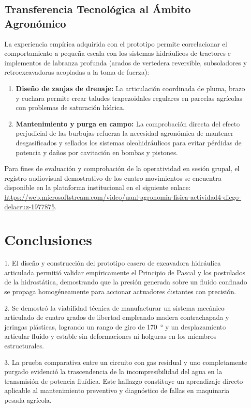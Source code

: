 \subsection{Transferencia Tecnológica al Ámbito Agronómico}
La experiencia empírica adquirida con el prototipo permite correlacionar el comportamiento a pequeña escala con los sistemas hidráulicos de tractores e implementos de labranza profunda (arados de vertedera reversible, subsoladores y retroexcavadoras acopladas a la toma de fuerza):
\begin{enumerate}
    \item \textbf{Diseño de zanjas de drenaje:} La articulación coordinada de pluma, brazo y cuchara permite crear taludes trapezoidales regulares en parcelas agrícolas con problemas de saturación hídrica.
    \item \textbf{Mantenimiento y purga en campo:} La comprobación directa del efecto perjudicial de las burbujas refuerza la necesidad agronómica de mantener desgasificados y sellados los sistemas oleohidráulicos para evitar pérdidas de potencia y daños por cavitación en bombas y pistones.
\end{enumerate}

Para fines de evaluación y comprobación de la operatividad en sesión grupal, el registro audiovisual demostrativo de los cuatro movimientos se encuentra disponible en la plataforma institucional en el siguiente enlace: \url{https://web.microsoftstream.com/video/uanl-agronomia-fisica-actividad4-diego-delacruz-1977875}.

\clearpage

\section{Conclusiones}
1. El diseño y construcción del prototipo casero de excavadora hidráulica articulada permitió validar empíricamente el Principio de Pascal y los postulados de la hidrostática, demostrando que la presión generada sobre un fluido confinado se propaga homogéneamente para accionar actuadores distantes con precisión.

2. Se demostró la viabilidad técnica de manufacturar un sistema mecánico articulado de cuatro grados de libertad empleando madera contrachapada y jeringas plásticas, logrando un rango de giro de \SI{170}{\degree} y un desplazamiento articular fluido y estable sin deformaciones ni holguras en los miembros estructurales.

3. La prueba comparativa entre un circuito con gas residual y uno completamente purgado evidenció la trascendencia de la incompresibilidad del agua en la transmisión de potencia fluídica. Este hallazgo constituye un aprendizaje directo aplicable al mantenimiento preventivo y diagnóstico de fallas en maquinaria pesada agrícola.

